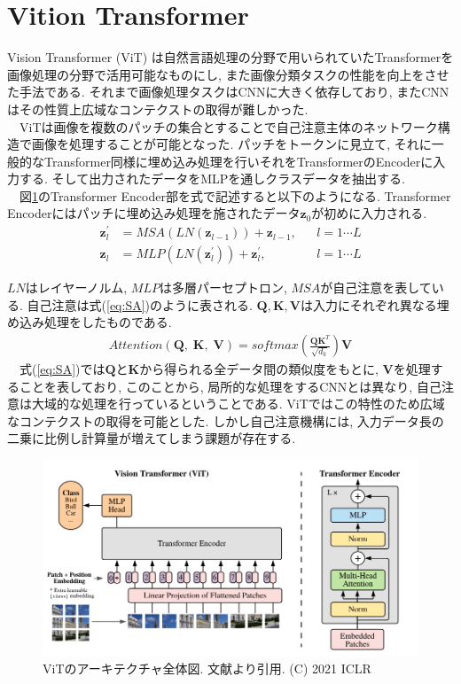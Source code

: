 \section{Vition Transformer}
Vision Transformer (ViT) \cite{ViT}は自然言語処理の分野で用いられていたTransformerを画像処理の分野で活用可能なものにし, また画像分類タスクの性能を向上をさせた手法である. それまで画像処理タスクはCNNに大きく依存しており, またCNNはその性質上広域なコンテクストの取得が難しかった.\\
　ViTは画像を複数のパッチの集合とすることで自己注意主体のネットワーク構造で画像を処理することが可能となった. パッチをトークンに見立て, それに一般的なTransformer同様に埋め込み処理を行いそれをTransformerのEncoderに入力する. そして出力されたデータをMLPを通しクラスデータを抽出する.\\
　図\ref{fig:vit_overall}のTransformer Encoder部を式で記述すると以下のようになる. Transformer Encoderにはパッチに埋め込み処理を施されたデータ$\bm{z}_{0}$が初めに入力される.
 \begin{align}
\bm{z}^{\prime}_{l} &= MSA(LN(\bm{z}_{l-1})) +\bm{z}_{l-1},& &l = 1 \cdots L \\
\bm{z}_l &= MLP(LN(\bm{z}^{\prime}_{l})) + \bm{z}^{\prime}_{l},& &l = 1 \cdots L
 \end{align}

$LN$はレイヤーノルム, $MLP$は多層パーセプトロン, $MSA$が自己注意を表している. 自己注意は式(\ref{eq:SA})のように表される\cite{SA}. $\mathbf{Q,K,V}$は入力にそれぞれ異なる埋め込み処理をしたものである.
\begin{align}
Attention(\mathbf Q,\;\mathbf K,\; \mathbf V)=softmax(\frac{\mathbf Q \mathbf K^T}{\sqrt{d_k}})\mathbf V \label{eq:SA}
\end{align}
　式(\ref{eq:SA})では$\mathbf{Q}$と$\mathbf{K}$から得られる全データ間の類似度をもとに, $\mathbf{V}$を処理することを表しており, このことから, 局所的な処理をするCNNとは異なり, 自己注意は大域的な処理を行っているということである. ViTではこの特性のため広域なコンテクストの取得を可能とした. しかし自己注意機構には, 入力データ長の二乗に比例し計算量が増えてしまう課題が存在する.

\begin{figure}[ht]
\centering
\includegraphics[scale=0.4]{figures/vit_overall.png}
\caption{ViTのアーキテクチャ全体図. 文献\cite{ViT}より引用. (C) 2021 ICLR　\label{fig:vit_overall}}
\end{figure}

